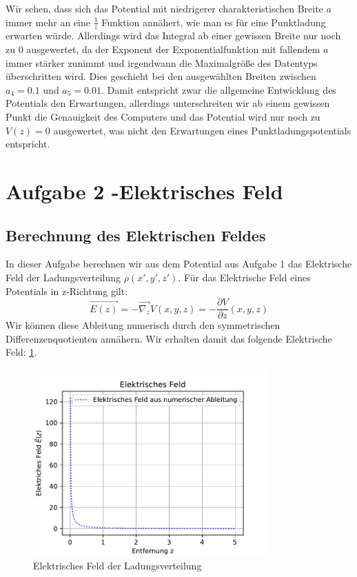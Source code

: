 \documentclass[12pt,a4paper]{article}
\begin{document}
Wir sehen, dass sich das Potential mit niedrigerer charakteristischen Breite $a$ immer mehr an eine $\frac{1}{z}$ Funktion annähert, wie man es für eine Punktladung erwarten würde. Allerdings wird das Integral ab einer gewissen Breite nur noch zu 0 ausgewertet, da der Exponent der Exponentialfunktion mit fallendem $a$ immer stärker zunimmt und irgendwann die Maximalgröße des Datentyps überschritten wird. Dies geschieht bei den ausgewählten Breiten zwischen $a_4 = 0.1$ und $a_5=0.01$. Damit entspricht zwar die allgemeine Entwicklung des Potentials den Erwartungen, allerdings unterschreiten wir ab einem gewissen Punkt die Genauigkeit des Computers und das Potential wird nur noch zu $V(z) = 0$ ausgewertet, was nicht den Erwartungen eines Punktladungspotentials entspricht.

\section{Aufgabe 2 -Elektrisches Feld}
\subsection{Berechnung des Elektrischen Feldes}
In dieser Aufgabe berechnen wir aus dem Potential aus Aufgabe 1 das Elektrische Feld der Ladungsverteilung $\rho(x',y',z')$. Für das Elektrische Feld eines Potentials in z-Richtung gilt:
\begin{equation}
	\vec{E(z)} = -\vec{\nabla_z}V(x,y,z) = -\frac{\partial V}{\partial z}(x,y,z)
\end{equation}
Wir können diese Ableitung numerisch durch den symmetrischen Differenzenquotienten annähern. Wir erhalten damit das folgende Elektrische Feld: \ref{f:e_field}.
\begin{figure}[htbp]
	\includegraphics[width=0.8\textwidth]{aufgabe2_1.pdf}
	\caption{Elektrisches Feld der Ladungsverteilung}
	\label{f:e_field}
\end{figure}
\end{document}

